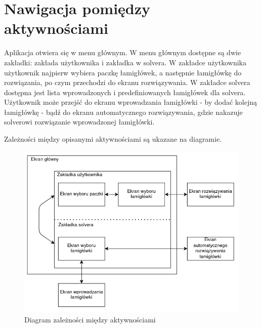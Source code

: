 \section{Nawigacja pomiędzy aktywnościami}
    Aplikacja otwiera się w menu głównym. W menu głównym dostępne są dwie zakładki: zakłada użytkownika
i zakładka w solvera. W zakładce użytkownika użytkownik najpierw wybiera paczkę łamigłówek, a
następnie łamigłówkę do rozwiązania, po czym przechodzi do ekranu rozwiązywania. W zakładce solvera
dostępna jest lista wprowadzonych i predefiniowanych łamigłówek dla solvera. Użytkownik może przejść
do ekranu wprowadzania łamigłówki - by dodać kolejną łamigłówkę - bądź do ekranu automatycznego rozwiązywania,
gdzie nakazuje solverowi rozwiązanie wprowadzonej łamigłówki.

    Zależności między opisanymi aktywnościami są ukazane na diagramie.

\begin{figure}[!htb]
    \centering
    \includegraphics[width=\textwidth]{images/screens_diagram.png}
    \caption{Diagram zależności między aktywnościami}
    \label{diagAktywnosci}
\end{figure}
